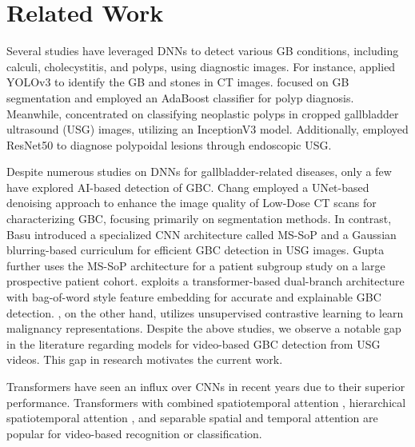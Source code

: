 \section{Related Work}
%
%
Several studies have leveraged DNNs to detect various GB conditions, including calculi, cholecystitis, and polyps, using diagnostic images. For instance, \cite{gbYolo} applied YOLOv3 to identify the GB and stones in CT images. \cite{gbPolyp} focused on GB segmentation and employed an AdaBoost classifier for polyp diagnosis. Meanwhile, \cite{gbPolyp2} concentrated on classifying neoplastic polyps in cropped gallbladder ultrasound (USG) images, utilizing an InceptionV3 model. Additionally, \cite{jang2021diagnostic} employed ResNet50 to diagnose polypoidal lesions through endoscopic USG.

%
Despite numerous studies on DNNs for gallbladder-related diseases, only a few have explored AI-based detection of GBC. Chang \etal \cite{chang2022ct} employed a UNet-based denoising approach to enhance the image quality of Low-Dose CT scans for characterizing GBC, focusing primarily on segmentation methods. In contrast, Basu \etal \cite{basu2022surpassing} introduced a specialized CNN architecture called MS-SoP and a Gaussian blurring-based curriculum for efficient GBC detection in USG images. Gupta \etal \cite{gbc-lancet} further uses the MS-SoP architecture for a patient subgroup study on a large prospective patient cohort. \cite{basu2023radformer} exploits a transformer-based dual-branch architecture with bag-of-word style feature embedding for accurate and explainable GBC detection. \cite{basu2022unsupervised}, on the other hand, utilizes unsupervised contrastive learning to learn malignancy representations. 
%
Despite the above studies, we observe a notable gap in the literature regarding models for video-based GBC detection from USG videos. This gap in research motivates the current work.

%

%
Transformers have seen an influx over CNNs in recent years due to their superior performance. Transformers with combined spatiotemporal attention \cite{vivit}, hierarchical spatiotemporal attention \cite{videoswin}, and separable spatial and temporal attention \cite{timesformer, vidtr} are popular for video-based recognition or classification. %

